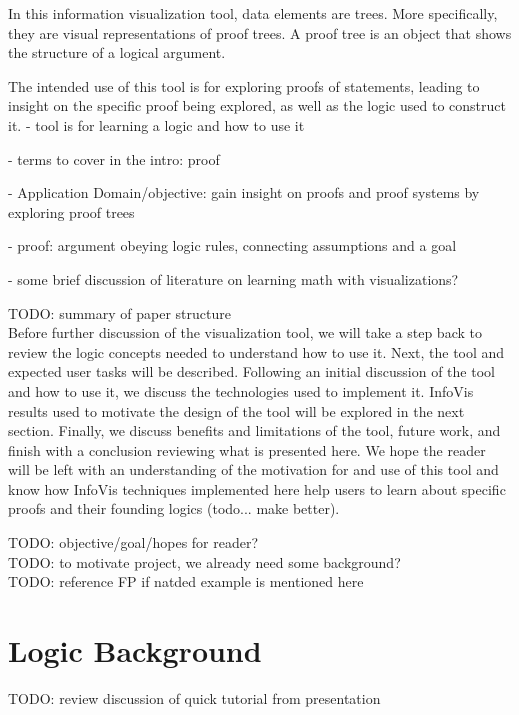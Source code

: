 \documentclass[conference]{IEEEtran}
\begin{document}
In this information visualization tool, data elements are trees. More specifically, they are visual representations of proof trees. A proof tree is an object that shows the structure of a logical argument.

The intended use of this tool is for exploring proofs of statements, leading to insight on the specific proof being explored, as well as the logic used to construct it.
- tool is for learning a logic and how to use it

- terms to cover in the intro: proof

- Application Domain/objective: gain insight on proofs and proof systems by exploring proof trees

- proof: argument obeying logic rules, connecting assumptions and a goal

- some brief discussion of literature on learning math with visualizations?

TODO: summary of paper structure \\

Before further discussion of the visualization tool, we will take a step back to review the logic concepts needed to understand how to use it. Next, the tool and expected user tasks will be described. Following an initial discussion of the tool and how to use it, we discuss the technologies used to implement it. InfoVis results used to motivate the design of the tool will be explored in the next section. Finally, we discuss benefits and limitations of the tool, future work, and finish with a conclusion reviewing what is presented here. We hope the reader will be left with an understanding of the motivation for and use of this tool and know how InfoVis techniques implemented here help users to learn about specific proofs and their founding logics (todo... make better).

TODO: objective/goal/hopes for reader? \\

TODO: to motivate project, we already need some background? \\

TODO: reference FP if natded example is mentioned here \\

\section{Logic Background}

TODO: review discussion of quick tutorial from presentation \\
\end{document}
